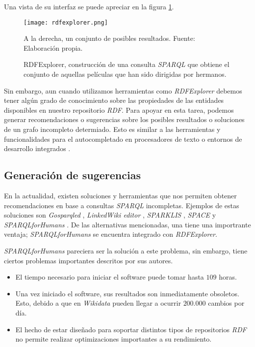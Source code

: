 Una vista de su interfaz se puede apreciar en la figura \ref{fig:rdfexplorer}.

\begin{figure}
    \centering
    \texttt{[image: rdfexplorer.png]}
    \caption{RDFExplorer, construcción de una consulta \textit{SPARQL} que obtiene el conjunto de aquellas películas que han sido dirigidas por hermanos.}
    A la derecha, un conjunto de posibles resultados. Fuente: Elaboración propia.
    \label{fig:rdfexplorer}
\end{figure}

Sin embargo, aun cuando utilizamos herramientas como \textit{RDFExplorer} debemos tener algún grado de conocimiento sobre las propiedades de las entidades disponibles en nuestro repositorio \textit{RDF}. Para apoyar en esta tarea, podemos generar recomendaciones o sugerencias sobre los posibles resultados o soluciones de un grafo incompleto determiado. Esto es similar a las herramientas y funcionalidades para el autocompletado en procesadores de texto o entornos de desarrollo integrados \cite{bruch2009learning}.

\subsection{Generación de sugerencias}

En la actualidad, existen soluciones y herramientas que nos permiten obtener recomendaciones en base a consultas \textit{SPARQL} incompletas. Ejemplos de estas soluciones son \textit{Gosparqled} \cite{campinas2014live}, \textit{LinkedWiki editor} \cite{rafes2018designing}, \textit{SPARKLIS} \cite{ferre2017sparklis}, \textit{SPACE} \cite{kramer2013space} y \textit{SPARQLforHumans} \cite{parra2020autocompletion}. De las alternativas mencionadas, una tiene una importrante ventaja; \textit{SPARQLforHumans} se encuentra integrado con \textit{RDFExplorer}.

\textit{SPARQLforHumans} pareciera ser la solución a este problema, sin embargo, tiene ciertos problemas importantes descritos por sus autores.

\begin{itemize}
    \item El tiempo necesario para iniciar el software puede tomar hasta $109$ horas.
    \item Una vez iniciado el software, sus resultados son inmediatamente obsoletos. Esto, debido a que en \textit{Wikidata} pueden llegar a ocurrir $200.000$ cambios por día.
    \item El hecho de estar diseñado para soportar distintos tipos de repositorios \textit{RDF} no permite realizar optimizaciones importantes a su rendimiento.
\end{itemize}

